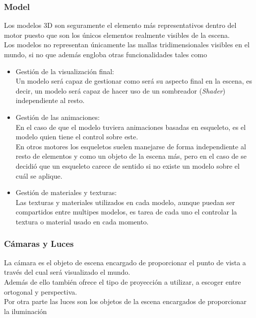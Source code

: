 \subsubsection{Model}
Los modelos 3D son seguramente el elemento más representativos dentro del motor puesto que son los únicos elementos realmente visibles de la escena.\\
Los modelos no representan únicamente las mallas tridimensionales visibles en el mundo, si no que además engloba otras funcionalidades tales como

\begin{itemize}
\item Gestión de la visualización final:\\
Un modelo será capaz de gestionar como será su aspecto final en la escena, es decir, un modelo será capaz de hacer uso de un sombreador (\textit{Shader}) independiente al resto.
\item Gestión de las animaciones:\\
En el caso de que el modelo tuviera animaciones basadas en esqueleto, es el modelo quien tiene el control sobre este.\\
En otros motores los esqueletos suelen manejarse de forma independiente al resto de elementos y como un objeto de la escena más, pero en el caso de \robotto se decidió que un esqueleto carece de sentido si no existe un modelo sobre el cuál se aplique.
\item Gestión de materiales y texturas:\\
Las texturas y materiales utilizados en cada modelo, aunque puedan ser compartidos entre multipes modelos, es tarea de cada uno el controlar la textura o material usado en cada momento.
\end{itemize}

\subsubsection{Cámaras y Luces}
La cámara es el objeto de escena encargado de proporcionar el punto de vista a través del cual será visualizado el mundo.\\
Además de ello también ofrece el tipo de proyección a utilizar, a escoger entre ortogonal y perspectiva.\\

Por otra parte las luces son los objetos de la escena encargados de proporcionar la iluminación \\

